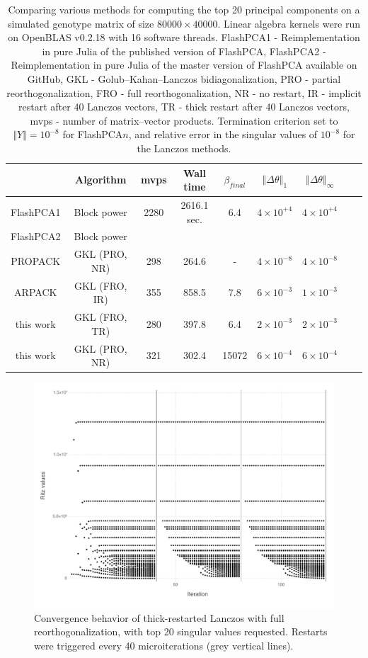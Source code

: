 \documentclass[final,leqno]{siamltex1213}
\begin{document}
\begin{table}
\begin{tabular}{|c|c|c|c|c|c|c|c|c|}
\hline
 & Algorithm & mvps & Wall time & $\beta_{final}$ & $\left\Vert \Delta\theta\right\Vert _{1}$ & $\left\Vert \Delta\theta\right\Vert _{\infty}$\tabularnewline
\hline
\hline
FlashPCA1 & Block power & 2280 & 2616.1 sec. & 6.4 & $4\times10^{+4}$ & $4\times10^{+4}$\tabularnewline
\hline
FlashPCA2 & Block power &  &  &  &  & \tabularnewline
\hline
PROPACK & GKL (PRO, NR) & 298 & 264.6 & - & $4\times10^{-8}$ & $4\times10^{-8}$\tabularnewline
\hline
ARPACK & GKL (FRO, IR) & 355 & 858.5 & 7.8 & $6\times10^{-3}$ & $1\times10^{-3}$\tabularnewline
\hline
this work & GKL (FRO, TR) & 280 & 397.8 & 6.4 & $2\times10^{-3}$ & $2\times10^{-3}$\tabularnewline
\hline
this work & GKL (PRO, NR) & 321 & 302.4 & 15072 & $6\times10^{-4}$ & $6\times10^{-4}$\tabularnewline
\hline
\end{tabular}

\caption{Comparing various methods for computing the top 20 principal
components on a simulated genotype matrix of size $80000\times40000$.
Linear algebra kernels were run on OpenBLAS v0.2.18 with 16 software threads.
FlashPCA1 - Reimplementation in pure Julia of the published version of FlashPCA,
FlashPCA2 - Reimplementation in pure Julia of the master version of FlashPCA available on GitHub,
GKL - Golub--Kahan--Lanczos bidiagonalization,
PRO - partial reorthogonalization,
FRO - full reorthogonalization,
NR - no restart,
IR - implicit restart after 40 Lanczos vectors,
TR - thick restart after 40 Lanczos vectors,
mvps - number of matrix--vector products.
Termination criterion set to $\Vert Y\Vert = 10^{-8}$ for FlashPCA$n$,
and relative error in the singular values of $10^{-8}$ for the Lanczos methods.
}
\end{table}

\begin{figure}
\caption{Convergence behavior of thick-restarted Lanczos with full reorthogonalization, with top 20 singular values requested. Restarts were triggered every 40 microiterations (grey vertical lines).
\label{fig:lanczos-tr}
}

\includegraphics[width=\textwidth]{fig/thickrestarted/fig-conv}
\end{figure}
\end{document}
